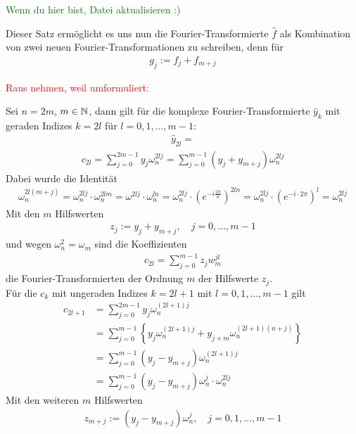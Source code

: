 \textcolor{green}{Wenn du hier bist, Datei aktualisieren :)}

Dieser Satz ermöglicht es uns nun die Fourier-Transformierte $\hat{f}$ als Kombination von zwei neuen 
Fourier-Transformationen zu schreiben, denn für 
\begin{align*}
  g_{j} := f_j + f_{m+j}
\end{align*}

\textcolor{red}{Raus nehmen, weil umformuliert:}

Sei $n=2m$, $m\in\mathbb N$, dann gilt für die komplexe Fourier-Transformierte $\hat{y}_k$ mit geraden Indizes 
$k=2l$ für $l=0,1,\dots,m-1$:
\begin{align*}
  \hat{y}_{2l} = 
\end{align*}
\begin{align*}
  c_{2l} = \sum_{j=0}^{2m-1}y_j\omega_n^{2lj} = \sum_{j=0}^{m-1} (y_j+y_{m+j})\omega_n^{2lj}
\end{align*}
Dabei wurde die Identität 
\begin{align*}
  \omega_n^{2l(m+j)} 
  = \omega_n^{2lj}\cdot \omega_n^{2lm} 
  = \omega^{2lj}\cdot \omega_n^{ln} = \omega_n^{2lj}\cdot \left(e^{-i\tfrac{2\pi}{n}}\right)^{2ln} 
  = \omega_n^{2lj}\cdot \left(e^{-i\cdot2\pi}\right)^l 
  = \omega_n^{2lj}
\end{align*}
Mit den $m$ Hilfswerten 
\begin{align*}
  z_j := y_j + y_{m+j}, \quad j=0,\dots,m-1
\end{align*}
und wegen $\omega_n^2 = \omega_m$ sind die Koeffizienten 
\begin{align*}
  c_{2l} = \sum_{j=0}^{m-1} z_jw_m^{jl}
\end{align*}
die Fourier-Transformierten der Ordnung $m$ der Hilfswerte $z_j$. \\
Für die $c_k$ mit ungeraden Indizes $k=2l+1$ mit $l=0,1,\dots,m-1$ gilt 
\begin{align*}
  c_{2l+1} &= \sum_{j=0}^{2m-1} y_j\omega_n^{(2l+1)j} \\
  &= \sum_{j=0}^{m-1}\left\{ y_j\omega_n^{(2l+1)j}+y_{j+m}\omega_n^{(2l+1)(n+j)}\right\}\\
  &= \sum_{j=0}^{m-1}(y_j-y_{m+j})\omega_n^{(2l+1)j} \\
  &= \sum_{j=0}^{m-1}(y_j-y_{m+j})\omega_n^{j}\cdot\omega_n^{2lj}
\end{align*}
Mit den weiteren $m$ Hilfswerten
\begin{align*}
  z_{m+j} := (y_j-y_{m+j})\omega_n^j,\quad j=0,1,\dots,m-1
\end{align*}
